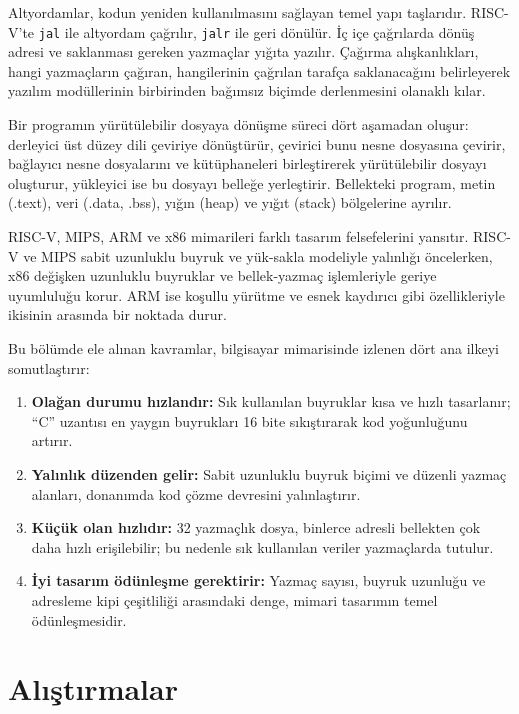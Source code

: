 Altyordamlar, kodun yeniden kullanılmasını sağlayan temel yapı taşlarıdır. RISC-V'te \texttt{jal} ile altyordam çağrılır, \texttt{jalr} ile geri dönülür. İç içe çağrılarda dönüş adresi ve saklanması gereken yazmaçlar yığıta yazılır. Çağırma alışkanlıkları, hangi yazmaçların çağıran, hangilerinin çağrılan tarafça saklanacağını belirleyerek yazılım modüllerinin birbirinden bağımsız biçimde derlenmesini olanaklı kılar.

Bir programın yürütülebilir dosyaya dönüşme süreci dört aşamadan oluşur: derleyici üst düzey dili çeviriye dönüştürür, çevirici bunu nesne dosyasına çevirir, bağlayıcı nesne dosyalarını ve kütüphaneleri birleştirerek yürütülebilir dosyayı oluşturur, yükleyici ise bu dosyayı belleğe yerleştirir. Bellekteki program, metin (.text), veri (.data, .bss), yığın (heap) ve yığıt (stack) bölgelerine ayrılır.

RISC-V, MIPS, ARM ve x86 mimarileri farklı tasarım felsefelerini yansıtır. RISC-V ve MIPS sabit uzunluklu buyruk ve yük-sakla modeliyle yalınlığı öncelerken, x86 değişken uzunluklu buyruklar ve bellek-yazmaç işlemleriyle geriye uyumluluğu korur. ARM ise koşullu yürütme ve esnek kaydırıcı gibi özellikleriyle ikisinin arasında bir noktada durur.

Bu bölümde ele alınan kavramlar, bilgisayar mimarisinde izlenen dört ana ilkeyi somutlaştırır:
\begin{sloppypar}
\begin{enumerate}
\item \textbf{Olağan durumu hızlandır:} Sık kullanılan buyruklar kısa ve hızlı tasarlanır; ``C'' uzantısı en yaygın buyrukları 16 bite sıkıştırarak kod yoğunluğunu artırır.
\item \textbf{Yalınlık düzenden gelir:} Sabit uzunluklu buyruk biçimi ve düzenli yazmaç alanları, donanımda kod çözme devresini yalınlaştırır.
\item \textbf{Küçük olan hızlıdır:} 32 yazmaçlık dosya, binlerce adresli bellekten çok daha hızlı erişilebilir; bu nedenle sık kullanılan veriler yazmaçlarda tutulur.
\item \textbf{İyi tasarım ödünleşme gerektirir:} Yazmaç sayısı, buyruk uzunluğu ve adresleme kipi çeşitliliği arasındaki denge, mimari tasarımın temel ödünleşmesidir.
\end{enumerate}

\end{sloppypar}

\section*{Alıştırmalar}

